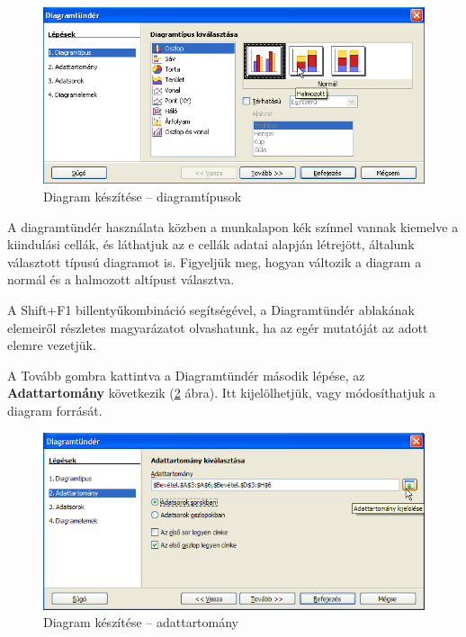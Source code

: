 \begin{figure}[!h]
\begin{center}
\includegraphics[width=15.999cm]{oocalcv2-img53.png}
\caption{Diagram készítése --  diagramtípusok}\label{DiagramTípus}
\end{center}
\end{figure}

A diagramtündér használata közben a munkalapon kék színnel
vannak kiemelve a kiindulási cellák, és láthatjuk az e cellák
adatai alapján létrejött, általunk választott típusú
diagramot is. Figyeljük meg, hogyan változik a diagram a normál
és a halmozott altípust választva. 

A Shift+F1 billentyűkombináció segítségével, a
Diagramtündér ablakának elemeiről részletes magyarázatot
olvashatunk, ha az egér mutatóját az adott elemre vezetjük.

A Tovább gombra kattintva a Diagramtündér második
lépése, az \textbf{Adattartomány} következik (\ref{DiagramAdat} ábra).
 Itt kijelölhetjük, vagy módosíthatjuk a diagram forrását.

\begin{figure}[!h]
\begin{center}
\includegraphics[width=15.999cm]{oocalcv2-img54.png}
\caption{Diagram készítése --  adattartomány}\label{DiagramAdat}
\end{center}
\end{figure}

